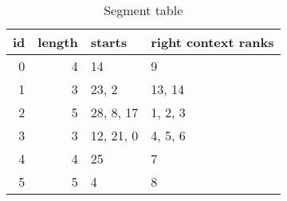 \begin{table}
    \caption{Segment table}
    \label{tab:segment}
    \begin{tabular}{rrll}
        \toprule
        id & length & starts & right context ranks \\
        \midrule
        0 & 4 & 14          & 9         \\
        1 & 3 & 23, 2       & 13, 14    \\
        2 & 5 & 28, 8, 17   & 1, 2, 3   \\
        3 & 3 & 12, 21, 0   & 4, 5, 6   \\
        4 & 4 & 25          & 7         \\
        5 & 5 & 4           & 8         \\
        \bottomrule
    \end{tabular}
\end{table}


